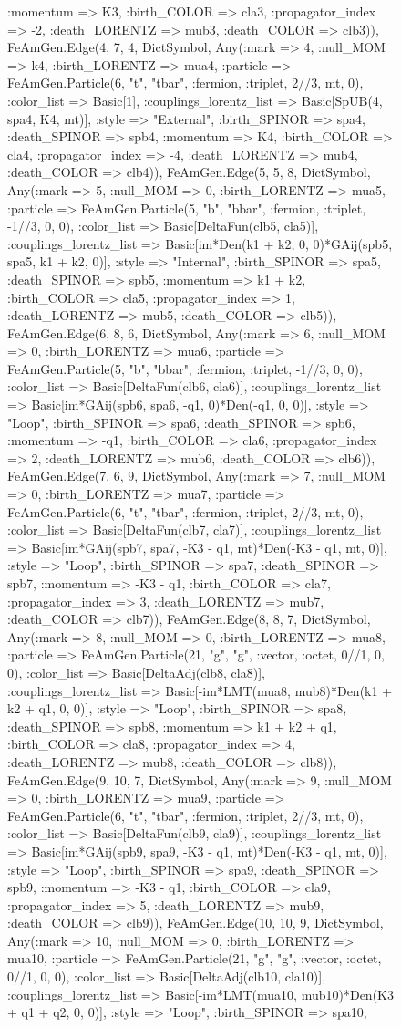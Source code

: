 \documentclass{revtex4}
\begin{document}
\begin{figure}[!htb]
\begin{center}
{:momentum => K3, :birth_COLOR => cla3, :propagator_index => -2, :death_LORENTZ => mub3, :death_COLOR => clb3)), FeAmGen.Edge(4, 7, 4, Dict{Symbol, Any}(:mark => 4, :null_MOM => k4, :birth_LORENTZ => mua4, :particle => FeAmGen.Particle(6, "t", "tbar", :fermion, :triplet, 2//3, mt, 0), :color_list => Basic[1], :couplings_lorentz_list => Basic[SpUB(4, spa4, K4, mt)], :style => "External", :birth_SPINOR => spa4, :death_SPINOR => spb4, :momentum => K4, :birth_COLOR => cla4, :propagator_index => -4, :death_LORENTZ => mub4, :death_COLOR => clb4)), FeAmGen.Edge(5, 5, 8, Dict{Symbol, Any}(:mark => 5, :null_MOM => 0, :birth_LORENTZ => mua5, :particle => FeAmGen.Particle(5, "b", "bbar", :fermion, :triplet, -1//3, 0, 0), :color_list => Basic[DeltaFun(clb5, cla5)], :couplings_lorentz_list => Basic[im*Den(k1 + k2, 0, 0)*GAij(spb5, spa5, k1 + k2, 0)], :style => "Internal", :birth_SPINOR => spa5, :death_SPINOR => spb5, :momentum => k1 + k2, :birth_COLOR => cla5, :propagator_index => 1, :death_LORENTZ => mub5, :death_COLOR => clb5)), FeAmGen.Edge(6, 8, 6, Dict{Symbol, Any}(:mark => 6, :null_MOM => 0, :birth_LORENTZ => mua6, :particle => FeAmGen.Particle(5, "b", "bbar", :fermion, :triplet, -1//3, 0, 0), :color_list => Basic[DeltaFun(clb6, cla6)], :couplings_lorentz_list => Basic[im*GAij(spb6, spa6, -q1, 0)*Den(-q1, 0, 0)], :style => "Loop", :birth_SPINOR => spa6, :death_SPINOR => spb6, :momentum => -q1, :birth_COLOR => cla6, :propagator_index => 2, :death_LORENTZ => mub6, :death_COLOR => clb6)), FeAmGen.Edge(7, 6, 9, Dict{Symbol, Any}(:mark => 7, :null_MOM => 0, :birth_LORENTZ => mua7, :particle => FeAmGen.Particle(6, "t", "tbar", :fermion, :triplet, 2//3, mt, 0), :color_list => Basic[DeltaFun(clb7, cla7)], :couplings_lorentz_list => Basic[im*GAij(spb7, spa7, -K3 - q1, mt)*Den(-K3 - q1, mt, 0)], :style => "Loop", :birth_SPINOR => spa7, :death_SPINOR => spb7, :momentum => -K3 - q1, :birth_COLOR => cla7, :propagator_index => 3, :death_LORENTZ => mub7, :death_COLOR => clb7)), FeAmGen.Edge(8, 8, 7, Dict{Symbol, Any}(:mark => 8, :null_MOM => 0, :birth_LORENTZ => mua8, :particle => FeAmGen.Particle(21, "g", "g", :vector, :octet, 0//1, 0, 0), :color_list => Basic[DeltaAdj(clb8, cla8)], :couplings_lorentz_list => Basic[-im*LMT(mua8, mub8)*Den(k1 + k2 + q1, 0, 0)], :style => "Loop", :birth_SPINOR => spa8, :death_SPINOR => spb8, :momentum => k1 + k2 + q1, :birth_COLOR => cla8, :propagator_index => 4, :death_LORENTZ => mub8, :death_COLOR => clb8)), FeAmGen.Edge(9, 10, 7, Dict{Symbol, Any}(:mark => 9, :null_MOM => 0, :birth_LORENTZ => mua9, :particle => FeAmGen.Particle(6, "t", "tbar", :fermion, :triplet, 2//3, mt, 0), :color_list => Basic[DeltaFun(clb9, cla9)], :couplings_lorentz_list => Basic[im*GAij(spb9, spa9, -K3 - q1, mt)*Den(-K3 - q1, mt, 0)], :style => "Loop", :birth_SPINOR => spa9, :death_SPINOR => spb9, :momentum => -K3 - q1, :birth_COLOR => cla9, :propagator_index => 5, :death_LORENTZ => mub9, :death_COLOR => clb9)), FeAmGen.Edge(10, 10, 9, Dict{Symbol, Any}(:mark => 10, :null_MOM => 0, :birth_LORENTZ => mua10, :particle => FeAmGen.Particle(21, "g", "g", :vector, :octet, 0//1, 0, 0), :color_list => Basic[DeltaAdj(clb10, cla10)], :couplings_lorentz_list => Basic[-im*LMT(mua10, mub10)*Den(K3 + q1 + q2, 0, 0)], :style => "Loop", :birth_SPINOR => spa10, }
\end{center}
\end{figure}
\end{document}

